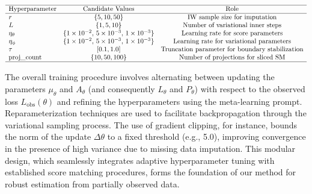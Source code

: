 \documentclass{article} %
\begin{document}
\[
\begin{array}{lcc}
\hline
\text{Hyperparameter} & \text{Candidate Values} & \text{Role} \\
\hline
r & \{5,10,50\} & \text{IW sample size for imputation} \\
L & \{1,5,10\} & \text{Number of variational inner steps} \\
\eta_\theta & \{1\times10^{-2},\,5\times10^{-3},\,1\times10^{-3}\} & \text{Learning rate for score parameters} \\
\eta_\phi & \{1\times10^{-2},\,5\times10^{-3},\,1\times10^{-3}\} & \text{Learning rate for variational parameters} \\
\tau & [0.1,1.0] & \text{Truncation parameter for boundary stabilization} \\
\text{proj\_count} & \{10,50,100\} & \text{Number of projections for sliced SM} \\
\hline
\end{array}
\]
\label{tab:hyperparams}

The overall training procedure involves alternating between updating the parameters \(\mu_\theta\) and \(A_\theta\) (and consequently \(L_\theta\) and \(P_\theta\)) with respect to the observed loss \(L_{\mathrm{obs}}(\theta)\) and refining the hyperparameters using the meta-learning prompt. Reparameterization techniques are used to facilitate backpropagation through the variational sampling process. The use of gradient clipping, for instance, bounds the norm of the update \(\Delta \theta\) to a fixed threshold (e.g., 5.0), improving convergence in the presence of high variance due to missing data imputation. This modular design, which seamlessly integrates adaptive hyperparameter tuning with established score matching procedures, forms the foundation of our method for robust estimation from partially observed data.
\end{document}
